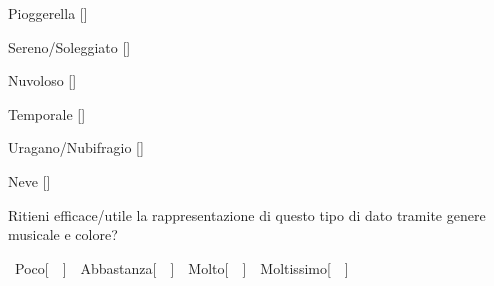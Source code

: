 \begin{compactenum}
\begin{compactitem}
		\item Pioggerella [\dotfill]

		\item Sereno/Soleggiato [\dotfill]

		\item Nuvoloso [\dotfill]

		\item Temporale [\dotfill]

		\item Uragano/Nubifragio [\dotfill]


		\item Neve [\dotfill]
		
		
	\end{compactitem}



	
	
	\item Ritieni efficace/utile la rappresentazione di questo tipo di dato tramite genere musicale e colore?

	~Poco[~~]~~Abbastanza[~~]~~Molto[~~]~~Moltissimo[~~]


\end{compactenum}

